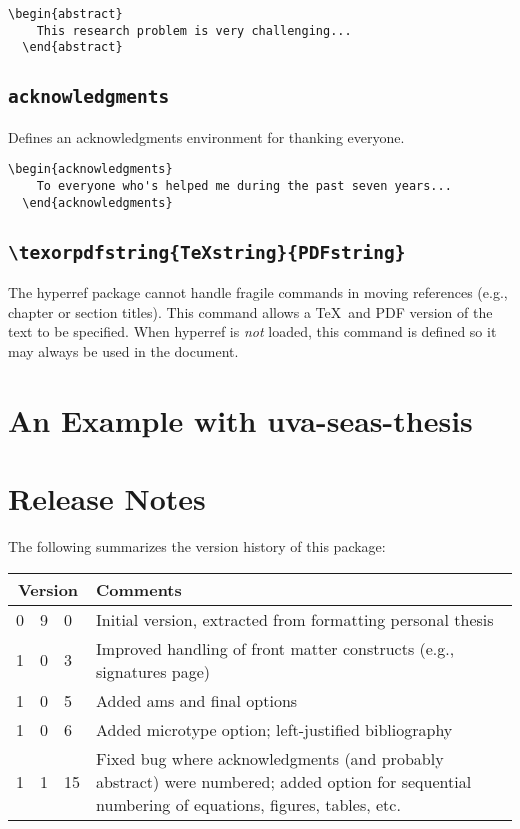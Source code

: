 \documentclass[10pt]{article}
\newcommand{\package}[1]{#1}
\newcommand{\option}[1]{#1}
\newcommand{\environment}[1]{\texttt{#1}}
\newcommand{\command}[1]{\texttt{\textbackslash#1}}
\newcommand{\thispackage}{\package{uva-seas-thesis}}
\begin{document}
\begin{lstlisting}[gobble=2]
  \begin{abstract}
    This research problem is very challenging...
  \end{abstract}
\end{lstlisting}

\subsection{\environment{acknowledgments}}
Defines an acknowledgments environment for thanking everyone.

\begin{lstlisting}[gobble=2]
  \begin{acknowledgments}
    To everyone who's helped me during the past seven years...
  \end{acknowledgments}
\end{lstlisting}

\subsection{\command{texorpdfstring\{\TeX string\}\{PDFstring\}}}
The \package{hyperref} package cannot handle fragile commands in moving references (e.g., chapter or section titles).
This command allows a \TeX\ and PDF version of the text to be specified.
When \package{hyperref} is \emph{not} loaded, this command is defined so it may always be used in the document.

\section{An Example with \thispackage}\label{section:example}



\section{Release Notes}\label{section:release notes}
The following summarizes the version history of this package:
\begin{longtable}{r@{.}r@{.}lp{.8\linewidth}}
  \multicolumn{3}{c}{Version} & Comments\\
  \midrule
  0	& 9	& 0	& Initial version, extracted from formatting personal thesis\\[2ex] %
  1	& 0	& 3	& Improved handling of front matter constructs (e.g., signatures page)\\
  1	& 0	& 5	& Added \option{ams} and \option{final} options\\
  1	& 0	& 6	& Added \option{microtype} option; left-justified bibliography\\
  1	& 1	& 15	& Fixed bug where acknowledgments (and probably abstract) were numbered; added option for sequential numbering of equations, figures, tables, etc.\\
\end{longtable}
\end{document}
